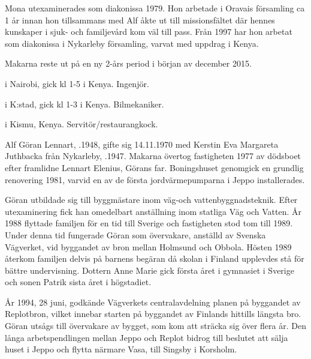 Mona utexaminerades som diakonissa 1979. Hon arbetade i Oravais församling ca 1 år innan hon tillsammans med Alf åkte ut till missionsfältet där hennes kunskaper i sjuk- och familjevård kom väl till pass. Från 1997 har hon arbetat som diakonissa i Nykarleby församling, varvat med uppdrag i Kenya.

Makarna reste ut på en ny 2-års period i början av december 2015.
\begin{jhchildren}
  \item {} i Nairobi, gick kl 1-5 i Kenya. Ingenjör.
  \item {} i K:stad, gick kl 1-3 i Kenya. Bilmekaniker.
  \item {} i Kismu, Kenya. Servitör/restaurangkock.
\end{jhchildren}


%
Alf Göran Lennart, .1948, gifte sig 14.11.1970 med Kerstin Eva Margareta Juthbacka från Nykarleby, .1947. Makarna övertog fastigheten 1977 av dödsboet efter framlidne Lennart Elenius, Görans far. Boningshuset genomgick en grundlig renovering 1981, varvid en av de första jordvärmepumparna i Jeppo installerades.

Göran utbildade sig till byggmästare inom väg-och vattenbyggnadsteknik. Efter utexaminering fick han omedelbart anställning inom statliga Väg och Vatten. År 1988 flyttade familjen för en tid till Sverige och fastigheten stod tom till 1989. Under denna tid fungerade Göran som övervakare, anställd av Svenska Vägverket, vid byggandet av bron mellan Holmsund och Obbola. Hösten 1989 återkom familjen delvis på barnens begäran då skolan i Finland upplevdes stå för bättre undervisning. Dottern Anne Marie gick första året i gymnasiet i Sverige och sonen Patrik sista året i högstadiet.

År 1994, 28 juni, godkände Vägverkets centralavdelning planen på byggandet av Replotbron, vilket innebar starten på byggandet av Finlands hittills längsta bro. Göran utsågs till övervakare av bygget, som kom att sträcka sig över flera år. Den långa arbetspendlingen mellan Jeppo och Replot bidrog till beslutet att sälja huset i Jeppo och flytta närmare Vasa, till Singsby i Korsholm.

